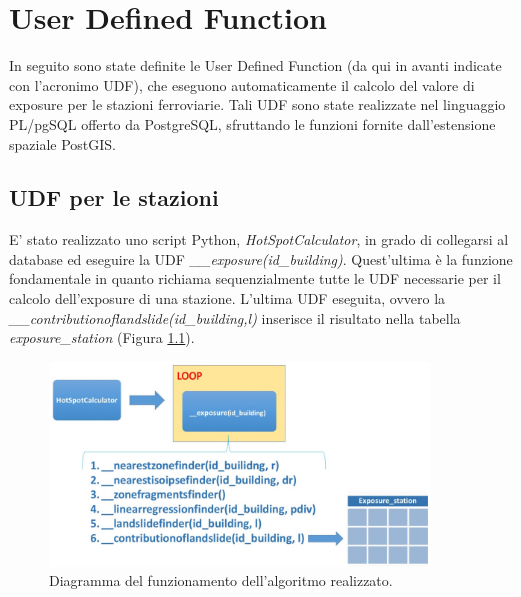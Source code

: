 
\chapter{User Defined Function}



\lstset{style=mystyle}

In seguito sono state definite le User Defined Function (da qui in avanti indicate con l’acronimo UDF), che eseguono automaticamente il calcolo del valore di exposure per le stazioni ferroviarie. Tali UDF sono state realizzate nel linguaggio PL/pgSQL offerto da PostgreSQL, sfruttando le funzioni fornite dall’estensione spaziale PostGIS.

\section{UDF per le stazioni}
E' stato realizzato uno script Python, \textit{HotSpotCalculator}, in grado di collegarsi al database ed eseguire la UDF  \textit{\_\_exposure(id\_building)}. Quest'ultima è la funzione fondamentale in quanto richiama sequenzialmente tutte le UDF necessarie per il calcolo dell'exposure di una stazione. L'ultima UDF eseguita, ovvero la \textit{\_\_contributionoflandslide(id\_building,l)} inserisce il risultato nella tabella \textit{exposure\_station} (Figura \ref{diagramma_algoritmo}). 

\begin{figure}[h]
	\centering
	\includegraphics[width=0.9\textwidth]{images/algorithm}
	\caption{Diagramma del funzionamento dell'algoritmo realizzato.}
	\label{diagramma_algoritmo}
\end{figure}

